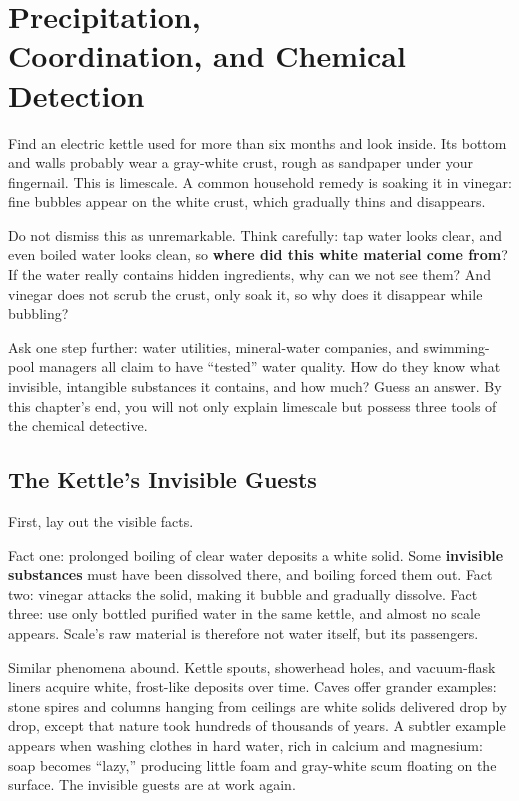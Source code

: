\chapter[Precipitation, Coordination, and Chemical Detection]{Precipitation,\protect\\ Coordination, and Chemical Detection}

\begin{kaichang}
Find an electric kettle used for more than six months and look inside. Its bottom and walls probably wear a gray-white crust, rough as sandpaper under your fingernail. This is limescale. A common household remedy is soaking it in vinegar: fine bubbles appear on the white crust, which gradually thins and disappears.

Do not dismiss this as unremarkable. Think carefully: tap water looks clear, and even boiled water looks clean, so \textbf{where did this white material come from}? If the water really contains hidden ingredients, why can we not see them? And vinegar does not scrub the crust, only soak it, so why does it disappear while bubbling?

Ask one step further: water utilities, mineral-water companies, and swimming-pool managers all claim to have ``tested'' water quality. How do they know what invisible, intangible substances it contains, and how much? Guess an answer. By this chapter's end, you will not only explain limescale but possess three tools of the chemical detective.
\end{kaichang}

\section{The Kettle's Invisible Guests}

First, lay out the visible facts.

Fact one: prolonged boiling of clear water deposits a white solid. Some \textbf{invisible substances} must have been dissolved there, and boiling forced them out. Fact two: vinegar attacks the solid, making it bubble and gradually dissolve. Fact three: use only bottled purified water in the same kettle, and almost no scale appears. Scale's raw material is therefore not water itself, but its passengers.

Similar phenomena abound. Kettle spouts, showerhead holes, and vacuum-flask liners acquire white, frost-like deposits over time. Caves offer grander examples: stone spires and columns hanging from ceilings are white solids delivered drop by drop, except that nature took hundreds of thousands of years. A subtler example appears when washing clothes in hard water, rich in calcium and magnesium: soap becomes ``lazy,'' producing little foam and gray-white scum floating on the surface. The invisible guests are at work again.

